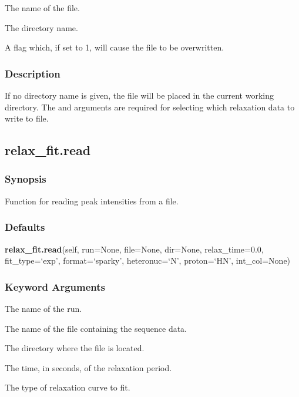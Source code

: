   The name of the file.

  The directory name.

  A flag which, if set to 1, will cause the file to be overwritten.

\subsubsection{Description}

If no directory name is given, the file will be placed in the current working directory.
The 
 and 
 arguments are required for selecting which relaxation  data
to write  to file.


\newpage

\subsection{relax\_fit.read}


\subsubsection{Synopsis}

Function for reading peak intensities from a file.

\subsubsection{Defaults}

\textsf{\textbf{relax\_fit.read}(self, run=None, file=None, dir=None, relax\_time=0.0, fit\_type=`exp', format=`sparky', heteronuc=`N', proton=`HN', int\_col=None)}


\subsubsection{Keyword Arguments}


  The name of the run.

  The name of the file containing the sequence  data.

  The directory where the file is located.

  The time, in seconds, of the relaxation  period.

  The type of relaxation  curve to fit.

